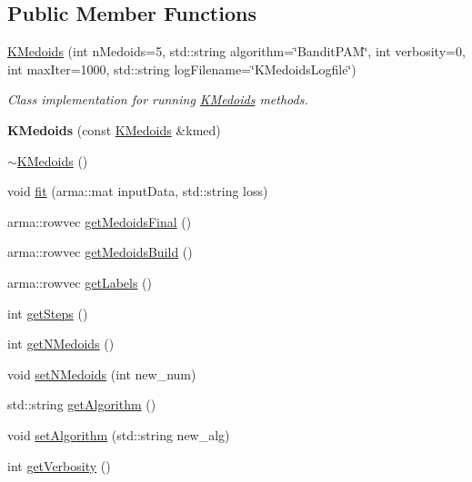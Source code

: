 \subsection*{Public Member Functions}
\begin{DoxyCompactItemize}
\item 
\hyperlink{classKMedoids_aef6c94fdc427f213dfeb719d711db6cf}{K\+Medoids} (int n\+Medoids=5, std\+::string algorithm=\char`\"{}Bandit\+P\+AM\char`\"{}, int verbosity=0, int max\+Iter=1000, std\+::string log\+Filename=\char`\"{}K\+Medoids\+Logfile\char`\"{})
\begin{DoxyCompactList}\small\item\em Class implementation for running \hyperlink{classKMedoids}{K\+Medoids} methods. \end{DoxyCompactList}\item 
\mbox{\label{classKMedoids_a3d05d453ee8c395102ac9d20c91a9a12}} 
{\bfseries K\+Medoids} (const \hyperlink{classKMedoids}{K\+Medoids} \&kmed)
\item 
\hyperlink{classKMedoids_a82710100b6fb5820c10bc3f796ed62ff}{$\sim$\+K\+Medoids} ()
\item 
void \hyperlink{classKMedoids_ae241800e72a6b4a677333ffbf06e1798}{fit} (arma\+::mat input\+Data, std\+::string loss)
\item 
arma\+::rowvec \hyperlink{classKMedoids_a26aa9827d2541626d959dc984f0f9bcb}{get\+Medoids\+Final} ()
\item 
arma\+::rowvec \hyperlink{classKMedoids_a54370d8d0f5c500f5deb859a9eab891c}{get\+Medoids\+Build} ()
\item 
arma\+::rowvec \hyperlink{classKMedoids_a89474787892880381e4d0282de541d03}{get\+Labels} ()
\item 
int \hyperlink{classKMedoids_a2c8d55468ebe909229ea7bcdb50e8351}{get\+Steps} ()
\item 
int \hyperlink{classKMedoids_ad738dc6b5a2dafa1ff4aeab807d6407d}{get\+N\+Medoids} ()
\item 
void \hyperlink{classKMedoids_ad28860f50c0b5a4968f99d103b3de06f}{set\+N\+Medoids} (int new\+\_\+num)
\item 
std\+::string \hyperlink{classKMedoids_a01a1bf63fdd2cd8b389c3f1c0619388f}{get\+Algorithm} ()
\item 
void \hyperlink{classKMedoids_a1a6dbc45f5d83bded48bf86cbc2690ad}{set\+Algorithm} (std\+::string new\+\_\+alg)
\item 
int \hyperlink{classKMedoids_a8d5372adbed828602f9311dbe9c70198}{get\+Verbosity} ()

\end{DoxyCompactItemize}
